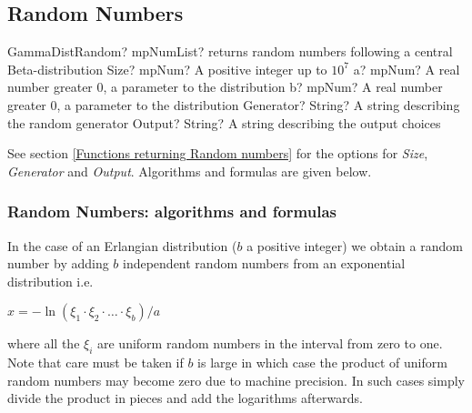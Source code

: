 %
%
%


\subsection{Random Numbers}

\begin{mpFunctionsExtract}
	\mpFunctionFive
	{GammaDistRandom? mpNumList? returns random numbers following a central Beta-distribution}
	{Size? mpNum? A positive integer up to $10^7$}
	{a? mpNum? A real number greater 0, a parameter to the distribution}
	{b? mpNum? A real number greater 0, a parameter to the distribution}
	{Generator? String? A string describing the random generator}
	{Output? String? A string describing the output choices}
\end{mpFunctionsExtract}

\vspace{0.3cm}

See section \ref{Functions returning Random numbers} for the options for  {\itshape\sffamily Size},  {\itshape\sffamily Generator} and {\itshape\sffamily Output}. Algorithms and formulas are given below.



\subsubsection{Random Numbers: algorithms and formulas}
In the case of an Erlangian distribution ($b$ a positive integer) we obtain a random number
by adding $b$ independent random numbers from an exponential distribution i.e.

$x = - \ln(\xi_1 \cdot \xi_2 \cdot \ldots \cdot \xi_b)/a$

where all the $\xi_i$ are uniform random numbers in the interval from zero to one. Note that
care must be taken if $b$ is large in which case the product of uniform random numbers may
become zero due to machine precision. In such cases simply divide the product in pieces
and add the logarithms afterwards.

